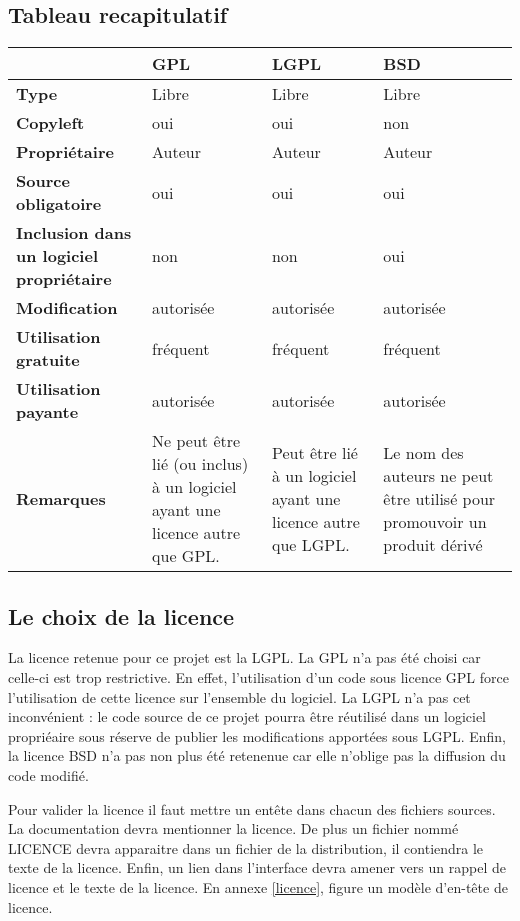 	\subsection{Tableau recapitulatif}
		\begin{tabular}{|p{3cm}|p{3cm}|p{3cm}|p{3cm}|}
			\hline                 
			& \textbf{GPL} & \textbf{LGPL} & \textbf{BSD} \\              
			\hline                 
			\textbf{Type} & Libre & Libre & Libre \\
			\hline                 
			\textbf{Copyleft} & oui & oui & non \\
			\hline                 
			\textbf{Propriétaire} & Auteur & Auteur & Auteur \\
			\hline                 
			\textbf{Source obligatoire} & oui & oui & oui \\
			\hline                 
			\textbf{Inclusion dans un logiciel propriétaire} & non & non & oui \\
			\hline                 
			\textbf{Modification} & autorisée & autorisée & autorisée \\
			\hline                 
			\textbf{Utilisation gratuite} & fréquent & fréquent & fréquent \\
			\hline                 
			\textbf{Utilisation payante} & autorisée & autorisée & autorisée \\
			\hline                 
			\textbf{Remarques} & Ne peut être lié (ou inclus) à un logiciel ayant une licence autre que GPL. & Peut être lié à un logiciel ayant une licence autre que LGPL. & Le nom des auteurs ne peut être utilisé pour promouvoir un produit dérivé \\
			\hline  
		\end{tabular}


	\subsection{Le choix de la licence}
		La licence retenue pour ce projet est la LGPL. La GPL n’a pas été choisi car celle-ci est trop restrictive. En effet, l’utilisation d’un code sous licence GPL force l’utilisation de cette licence sur l’ensemble du logiciel. La LGPL n’a pas cet inconvénient : le code source de ce projet pourra être réutilisé dans un logiciel propriéaire sous réserve de publier les modifications apportées sous LGPL. Enfin, la licence BSD n’a pas non plus été retenenue car elle n’oblige pas la diffusion du code modifié.

		Pour valider la licence il faut mettre un entête dans chacun des fichiers sources. La documentation devra mentionner la licence. De plus un fichier nommé LICENCE devra apparaitre dans un fichier de la distribution, il contiendra le texte de la licence. Enfin, un lien dans l’interface devra amener vers un rappel de licence et le texte de la licence. En annexe \ref{licence}, figure un modèle d’en-tête de licence.